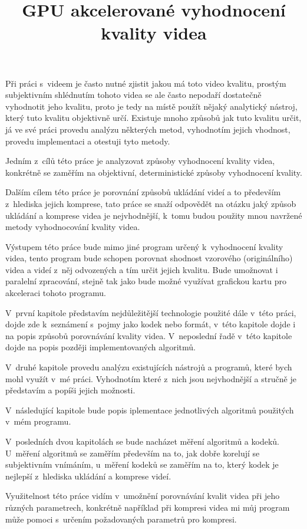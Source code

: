 \documentclass[thesis=M,czech]{FITthesis}[2016/06/26]
\title{GPU akcelerované vyhodnocení kvality videa}
\begin{document}
\renewcommand{\subsectionautorefname}{sekci}
\renewcommand{\sectionautorefname}{sekci}
\renewcommand{\chapterautorefname}{kap.}


\begin{introduction}
Při práci s~videem je často nutné zjistit jakou má toto video kvalitu, prostým subjektivním shlédnutím tohoto videa se ale často nepodaří dostatečně vyhodnotit jeho kvalitu, proto je tedy na místě použít nějaký analytický nástroj, který tuto kvalitu objektivně určí. Existuje mnoho způsobů jak tuto kvalitu určit, já ve své práci provedu analýzu některých metod, vyhodnotím jejich vhodnost, provedu implementaci a otestuji tyto metody.  

Jedním z~cílů této práce je analyzovat způsoby vyhodnocení kvality videa, konkrétně se zaměřím na objektivní, deterministické způsoby vyhodnocení kvality.

Dalším cílem této práce je porovnání způsobů ukládání videí a to především z~hlediska jejich komprese, tato práce se snaží odpovědět na otázku jaký způsob ukládání a komprese videa je nejvhodnější, k~tomu budou použity mnou navržené metody vyhodnocování kvality videa.

Výstupem této práce bude mimo jiné program určený k~vyhodnocení kvality videa, tento program bude schopen porovnat shodnost vzorového (originálního) videa a videí z~něj odvozených a tím určit jejich kvalitu. Bude umožnovat i paralelní zpracování, stejně tak jako bude možné využívat grafickou kartu pro akceleraci tohoto programu.

V~první kapitole představím nejdůležitější technologie použité dále v~této práci, dojde zde k~seznámení s~pojmy jako kodek nebo formát, v~této kapitole dojde i na popis způsobů porovnávání kvality videa. V~neposlední řadě v~této kapitole dojde na popis později implementovaných algoritmů.

V~druhé kapitole provedu analýzu existujících nástrojů a programů, které bych mohl využít v~mé práci. Vyhodnotím které z~nich jsou nejvhodnější a stručně je představím a popíši jejich možnosti.

V~následující kapitole bude popis iplementace jednotlivých algoritmů použitých v~mém programu.

V~posledních dvou kapitolách se bude nacházet měření algoritmů a kodeků. U~měření algoritmů se zaměřím především na to, jak dobře korelují se subjektivním vnímáním, u~měření kodeků se zaměřím na to, který kodek je nejlepší z~hlediska ukládání a komprese videí.

Využitelnost této práce vidím v~umožnění porovnávání kvalit videa při jeho různých parametrech, konkrétně například při kompresi videa mi můj program může pomoci s~určením požadovaných parametrů pro kompresi.
\end{introduction}
\end{document}
